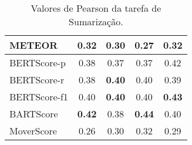 \begin{frame}
{\begin{table}
{\begin{tabular}{l c c c c}
                    METEOR  & 0.32 & 0.30 & 0.27 & 0.32\\
                    \hline
                    BERTScore-p  & 0.38 & 0.37 & 0.37 & 0.42\\
                    BERTScore-r  & 0.38 & \textbf{0.40} & 0.40 & 0.39\\
                    BERTScore-f1 & 0.40 & \textbf{0.40} & 0.40 & \textbf{0.43}\\
                    BARTScore    & \textbf{0.42} & 0.38 & \textbf{0.44} & 0.40\\
                    MoverScore   & 0.26 & 0.30 & 0.32 & 0.29\\
                    \hline
                \end{tabular}
            }
            \caption{Valores de Pearson da tarefa de Sumarização.}
        \end{table}
    }
\end{frame}


